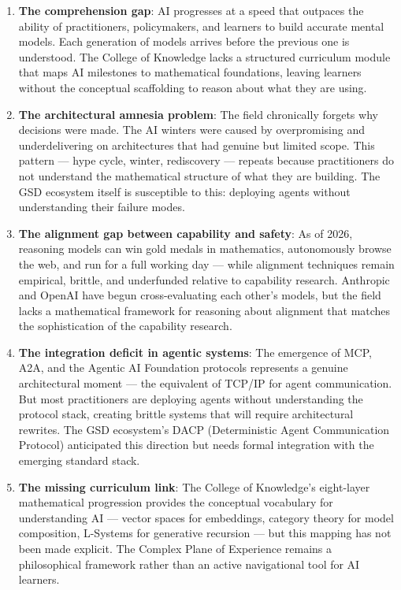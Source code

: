 \documentclass[11pt,letterpaper]{article}
\begin{document}
\begin{enumerate}[leftmargin=*, label=\textbf{P\arabic*.}]
\item \textbf{The comprehension gap}: AI progresses at a speed that outpaces the ability of practitioners, policymakers, and learners to build accurate mental models. Each generation of models arrives before the previous one is understood. The College of Knowledge lacks a structured curriculum module that maps AI milestones to mathematical foundations, leaving learners without the conceptual scaffolding to reason about what they are using.

\item \textbf{The architectural amnesia problem}: The field chronically forgets why decisions were made. The AI winters were caused by overpromising and underdelivering on architectures that had genuine but limited scope. This pattern — hype cycle, winter, rediscovery — repeats because practitioners do not understand the mathematical structure of what they are building. The GSD ecosystem itself is susceptible to this: deploying agents without understanding their failure modes.

\item \textbf{The alignment gap between capability and safety}: As of 2026, reasoning models can win gold medals in mathematics, autonomously browse the web, and run for a full working day — while alignment techniques remain empirical, brittle, and underfunded relative to capability research. Anthropic and OpenAI have begun cross-evaluating each other's models, but the field lacks a mathematical framework for reasoning about alignment that matches the sophistication of the capability research.

\item \textbf{The integration deficit in agentic systems}: The emergence of MCP, A2A, and the Agentic AI Foundation protocols represents a genuine architectural moment — the equivalent of TCP/IP for agent communication. But most practitioners are deploying agents without understanding the protocol stack, creating brittle systems that will require architectural rewrites. The GSD ecosystem's DACP (Deterministic Agent Communication Protocol) anticipated this direction but needs formal integration with the emerging standard stack.

\item \textbf{The missing curriculum link}: The College of Knowledge's eight-layer mathematical progression provides the conceptual vocabulary for understanding AI — vector spaces for embeddings, category theory for model composition, L-Systems for generative recursion — but this mapping has not been made explicit. The Complex Plane of Experience remains a philosophical framework rather than an active navigational tool for AI learners.
\end{enumerate}
\end{document}
